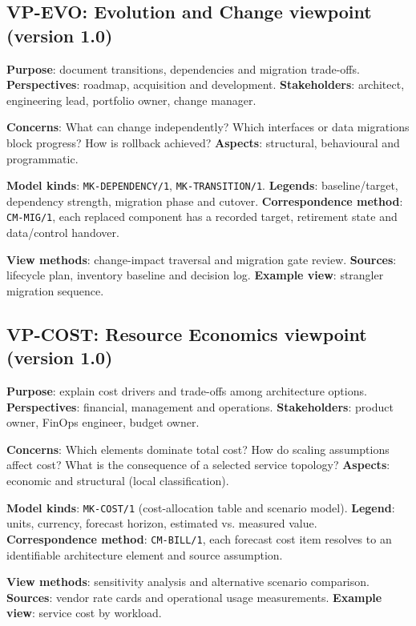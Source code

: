 \documentclass[11pt,letterpaper]{article}
\begin{document}
\subsection{VP-EVO: Evolution and Change viewpoint (version 1.0)}
\textbf{Purpose}: document transitions, dependencies and migration trade-offs. \textbf{Perspectives}: roadmap, acquisition and development. \textbf{Stakeholders}: architect, engineering lead, portfolio owner, change manager.\par
\textbf{Concerns}: What can change independently? Which interfaces or data migrations block progress? How is rollback achieved? \textbf{Aspects}: structural, behavioural and programmatic.\par
\textbf{Model kinds}: \texttt{MK-DEPENDENCY/1}, \texttt{MK-TRANSITION/1}. \textbf{Legends}: baseline/target, dependency strength, migration phase and cutover. \textbf{Correspondence method}: \texttt{CM-MIG/1}, each replaced component has a recorded target, retirement state and data/control handover.\par
\textbf{View methods}: change-impact traversal and migration gate review. \textbf{Sources}: lifecycle plan, inventory baseline and decision log. \textbf{Example view}: strangler migration sequence.\par
\subsection{VP-COST: Resource Economics viewpoint (version 1.0)}
\textbf{Purpose}: explain cost drivers and trade-offs among architecture options. \textbf{Perspectives}: financial, management and operations. \textbf{Stakeholders}: product owner, FinOps engineer, budget owner.\par
\textbf{Concerns}: Which elements dominate total cost? How do scaling assumptions affect cost? What is the consequence of a selected service topology? \textbf{Aspects}: economic and structural (local classification).\par
\textbf{Model kinds}: \texttt{MK-COST/1} (cost-allocation table and scenario model). \textbf{Legend}: units, currency, forecast horizon, estimated vs. measured value. \textbf{Correspondence method}: \texttt{CM-BILL/1}, each forecast cost item resolves to an identifiable architecture element and source assumption.\par
\textbf{View methods}: sensitivity analysis and alternative scenario comparison. \textbf{Sources}: vendor rate cards and operational usage measurements. \textbf{Example view}: service cost by workload.\par
\end{document}
